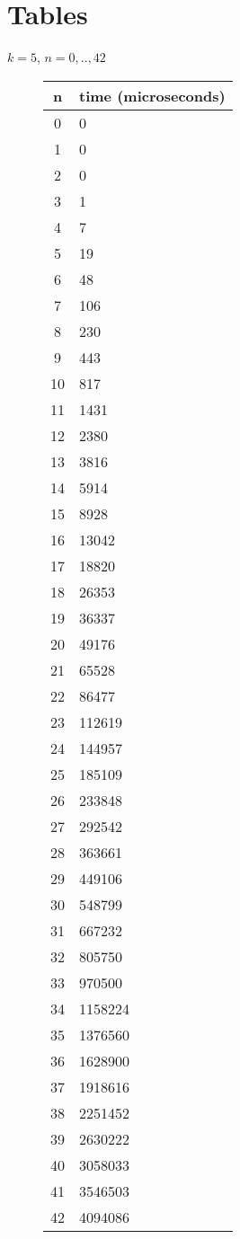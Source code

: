 \chapter{Tables}
$k=5$, $n=0,..,42$
\begin{figure}
	\begin{tabular}{| c | l |}
		\hline
		n & time (microseconds)	\\
		\hline
		0 & 0\\
		\hline
		1 & 0\\
		\hline
		2 & 0\\
		\hline
		3 & 1\\
		\hline
		4 & 7\\
		\hline
		5 & 19\\
		\hline
		6 & 48\\
		\hline
		7 & 106\\
		\hline
		8 & 230\\
		\hline
		9 & 443\\
		\hline
		10 & 817\\
		\hline
		11 & 1431\\
		\hline
		12 & 2380\\
		\hline
		13 & 3816\\
		\hline
		14 & 5914\\
		\hline
		15 & 8928\\
		\hline
		16 & 13042\\
		\hline
		17 & 18820\\
		\hline
		18 & 26353\\
		\hline
		19 & 36337\\
		\hline
		20 & 49176\\
		\hline
		21 & 65528\\
		\hline
		22 & 86477\\
		\hline
		23 & 112619\\
		\hline
		24 & 144957\\
		\hline
		25 & 185109\\
		\hline
		26 & 233848\\
		\hline
		27 & 292542\\
		\hline
		28 & 363661\\
		\hline
	29 & 449106\\
	\hline
30 & 548799\\
\hline
31 & 667232\\
\hline
32 & 805750\\
\hline
33 & 970500\\
\hline
34 & 1158224\\
\hline
35 & 1376560\\
\hline
36 & 1628900\\
\hline
37 & 1918616\\
\hline
38 & 2251452\\
\hline
39 & 2630222\\
\hline
40 & 3058033\\
\hline
41 & 3546503\\
\hline
42 & 4094086\\
\hline
\end{tabular}
\end{figure}

